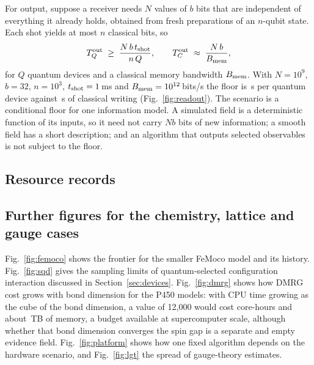 For output, suppose a receiver needs $N$ values of $b$ bits that are independent of everything it already holds, obtained from fresh preparations of an $n$-qubit state. Each shot yields at most $n$ classical bits, so
\begin{equation}
T^{\rm out}_Q \;\ge\; \frac{N\,b\,t_{\rm shot}}{n\,Q},\qquad T^{\rm out}_C \;\approx\; \frac{N\,b}{B_{\rm mem}},
\label{eq:output}
\end{equation}
for $Q$ quantum devices and a classical memory bandwidth $B_{\rm mem}$. With $N=10^9$, $b=32$, $n=10^3$, $t_{\rm shot}=1$\,ms and $B_{\rm mem}=10^{12}$\,bits/s the floor is \outQ\,s per quantum device against \outC\,s of classical writing (Fig.~\ref{fig:readout}). The scenario is a conditional floor for one information model. A simulated field is a deterministic function of its inputs, so it need not carry $Nb$ bits of new information; a smooth field has a short description; and an algorithm that outputs selected observables is not subject to the floor.



\subsection{Resource records}


\subsection{Further figures for the chemistry, lattice and gauge cases}
Fig.~\ref{fig:femoco} shows the frontier for the smaller FeMoco model and its history. Fig.~\ref{fig:sqd} gives the sampling limits of quantum-selected configuration interaction discussed in Section~\ref{sec:devices}. Fig.~\ref{fig:dmrg} shows how DMRG cost grows with bond dimension for the P450 models: with CPU time growing as the cube of the bond dimension, a value of 12{,}000 would cost \planCoreH{} core-hours and about \planMemTB\,TB of memory, a budget available at supercomputer scale, although whether that bond dimension converges the spin gap is a separate and empty evidence field. Fig.~\ref{fig:platform} shows how one fixed algorithm depends on the hardware scenario, and Fig.~\ref{fig:lgt} the spread of gauge-theory estimates.







